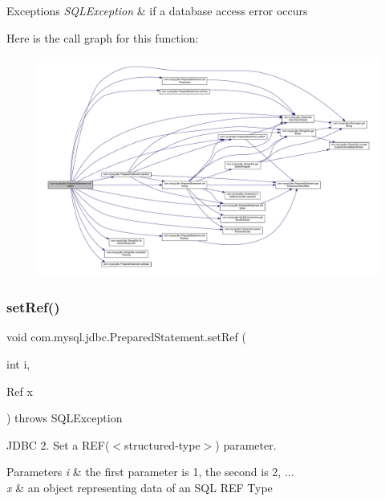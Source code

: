 \begin{DoxyExceptions}{Exceptions}
{\em S\+Q\+L\+Exception} & if a database access error occurs \\
\hline
\end{DoxyExceptions}
Here is the call graph for this function\+:
\nopagebreak
\begin{figure}[H]
\begin{center}
\leavevmode
\includegraphics[width=350pt]{classcom_1_1mysql_1_1jdbc_1_1_prepared_statement_aee3c411b599fe20f669701c025cc7a90_cgraph}
\end{center}
\end{figure}
\mbox{\label{classcom_1_1mysql_1_1jdbc_1_1_prepared_statement_ae89f89fcb2083ed1bc44a04a7a5757b4}} 
\subsubsection{\texorpdfstring{set\+Ref()}{setRef()}}
{\footnotesize\ttfamily void com.\+mysql.\+jdbc.\+Prepared\+Statement.\+set\+Ref (\begin{DoxyParamCaption}\item[{int}]{i,  }\item[{Ref}]{x }\end{DoxyParamCaption}) throws S\+Q\+L\+Exception}

J\+D\+BC 2. Set a R\+EF($<$structured-\/type$>$) parameter.


\begin{DoxyParams}{Parameters}
{\em i} & the first parameter is 1, the second is 2, ... \\
\hline
{\em x} & an object representing data of an S\+QL R\+EF Type\\
\hline
\end{DoxyParams}

